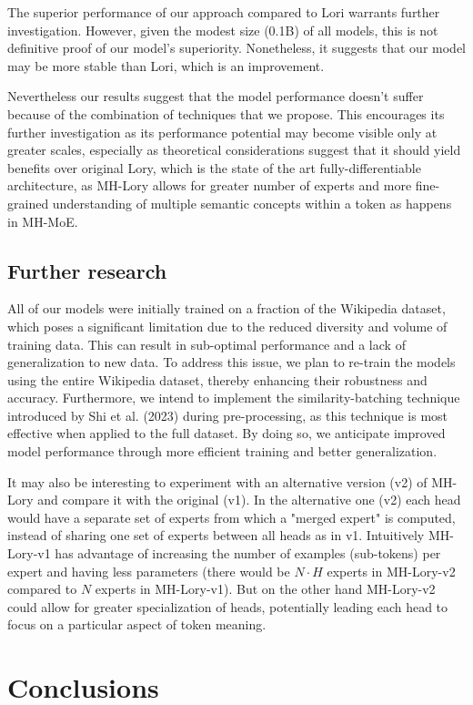 \documentclass[12pt]{article}
\begin{document}
The superior performance of our approach compared to Lori warrants further investigation. However, given the modest size (0.1B) of all models, this is not definitive proof of our model's superiority. Nonetheless, it suggests that our model may be more stable than Lori, which is an improvement. 

Nevertheless our results suggest that the model performance doesn't suffer because of the combination of techniques that we propose. This encourages its further investigation as its performance potential may become visible only at greater scales, especially as theoretical considerations suggest that it should yield benefits over original Lory, which is the state of the art fully-differentiable architecture, as MH-Lory allows for greater number of experts and more fine-grained understanding of multiple semantic concepts within a token as happens in MH-MoE.
\subsection{Further research}
All of our models were initially trained on a fraction of the Wikipedia dataset, which poses a significant limitation due to the reduced diversity and volume of training data. This can result in sub-optimal performance and a lack of generalization to new data. To address this issue, we plan to re-train the models using the entire Wikipedia dataset, thereby enhancing their robustness and accuracy. Furthermore, we intend to implement the similarity-batching technique introduced by Shi et al. (2023) during pre-processing, as this technique is most effective when applied to the full dataset. By doing so, we anticipate improved model performance through more efficient training and better generalization.

It may also be interesting to experiment with an alternative version (v2) of MH-Lory and compare it with the original (v1). In the alternative one (v2) each head would have a separate set of experts from which a "merged expert" is computed, instead of sharing one set of experts between all heads as in v1. Intuitively MH-Lory-v1 has advantage of increasing the number of examples (sub-tokens) per expert and having less parameters (there would be $N \cdot H$ experts in MH-Lory-v2 compared to $N$ experts in MH-Lory-v1). But on the other hand MH-Lory-v2 could allow for greater specialization of heads, potentially leading each head to focus on a particular aspect of token meaning.


\section{Conclusions}
\end{document}
